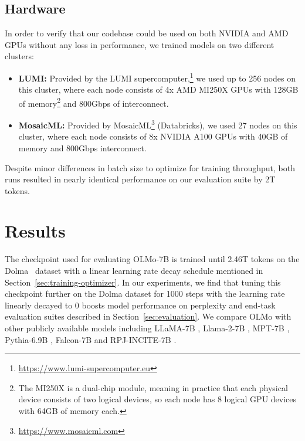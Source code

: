 \documentclass[11pt]{article}
\newcommand{\olmo}{OLMo\xspace}
\newcommand{\model}{OLMo-7B\xspace}
\begin{document}
\subsection{Hardware} \label{sec:hardware}
In order to verify that our codebase could be used on both NVIDIA and AMD GPUs without any loss in performance, we trained models on two different clusters:
\begin{itemize}[noitemsep,leftmargin=4.5mm]
    \item \textbf{LUMI:} Provided by the LUMI supercomputer,\footnote{\url{https://www.lumi-supercomputer.eu}} we used up to 256 nodes on this cluster, 
where each node consists of 4x AMD MI250X GPUs with 128GB of memory\footnote{The MI250X is a dual-chip module, meaning in practice that each physical device consists of two logical devices, so each node has 8 logical GPU devices with 64GB of memory each.} and 800Gbps of interconnect.
    \item \textbf{MosaicML:} Provided by MosaicML\footnote{\url{https://www.mosaicml.com}} (Databricks), we used 27 nodes on this cluster, where each node consists of 8x NVIDIA A100 GPUs with 40GB of memory and 800Gbps interconnect.
\end{itemize}
Despite minor differences in batch size to optimize for training throughput, both runs resulted in nearly identical performance on our evaluation suite by 2T tokens.




\section{Results}
\label{sec:results}
The checkpoint used for evaluating \model is trained until 2.46T
tokens on the Dolma~\citep{dolma} dataset with a linear learning rate decay schedule mentioned in Section~\ref{sec:training-optimizer}. In our experiments, we find that tuning this checkpoint further on the Dolma dataset for 1000 steps with the learning rate linearly decayed to 0 boosts model performance on perplexity and end-task evaluation suites described in Section~\ref{sec:evaluation}.  We compare \olmo with other publicly available models including LLaMA-7B \citep{touvron2023llama1}, Llama-2-7B \citep{touvron2023llama2}, MPT-7B \citep{MosaicML2023Introducing}, Pythia-6.9B \citep{pmlr-v202-biderman23a}, Falcon-7B \citep{Falcon} and RPJ-INCITE-7B \citep{together2023redpajama}.
\end{document}
